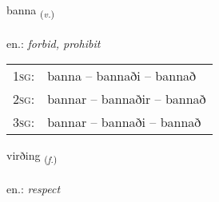 \documentclass[frontgrid, backgrid]{flacards}\usepackage[]{graphicx}\usepackage[]{xcolor}
\begin{document}
\renewcommand{\blhead}{\vskip5pt {\small\bfseries\footnotesize Sagnorð | Verb }}
\renewcommand{\bcfoot}{\vskip5pt \hspace{2pt}{\small\bfseries\footnotesize 2K}}


{banna \small{\textsubscript{(\textit{v.})}} \\[1ex] %
\textphonetic{[pana]} \\
en.: \emph{forbid, prohibit} \\  [2ex]
\renewcommand*{\arraystretch}{0.8}
\begin{tabular}{p{1cm}l}
\textsc{1sg}: & banna -- bannaði -- bannað \\ 
\textsc{2sg}: & bannar -- bannaðir -- bannað \\ 
\textsc{3sg}: & bannar -- bannaði -- bannað \\ 
\end{tabular}
}

\renewcommand{\flhead}{\vskip5pt \fboxsep=0pt {\small\bfseries\footnotesize Nafnorð | Noun}}
\renewcommand{\fcfoot}{\vskip5pt \fboxsep=0pt \hspace{2pt}{\small\bfseries\footnotesize 2K}}

\renewcommand{\blhead}{\vskip5pt {\small\bfseries\footnotesize Nafnorð | Noun }}
\renewcommand{\bcfoot}{\vskip5pt \hspace{2pt}{\small\bfseries\footnotesize 2K}}


{virðing \small{\textsubscript{(\textit{f.})}} \\[1ex] %
\textphonetic{[vɪrðiŋk]} \\
en.: \emph{respect} \\  [2ex]
\renewcommand*{\arraystretch}{0.8}
}

\renewcommand{\flhead}{\vskip5pt \fboxsep=0pt {\small\bfseries\footnotesize Nafnorð | Noun}}
\renewcommand{\fcfoot}{\vskip5pt \fboxsep=0pt \hspace{2pt}{\small\bfseries\footnotesize 2K}}
\end{document}
